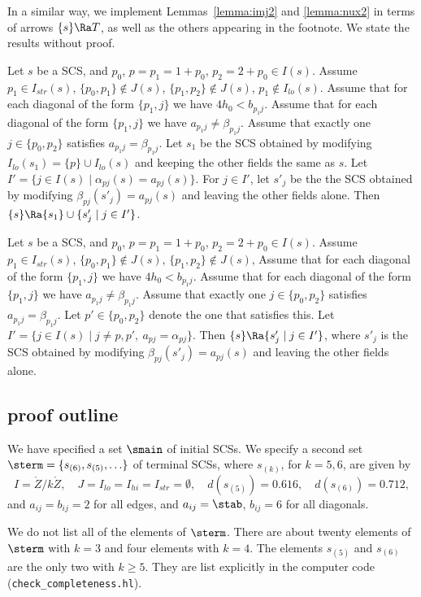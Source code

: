 In a similar way, we implement Lemmas~\ref{lemma:imj2} and \ref{lemma:nux2} 
in terms of arrows $\{s\}\Ra T$, as well as the others appearing in the footnote.
We state the results without proof.

\begin{lemma}
Let $s$ be a SCS, and $p_0$, $p=p_1=1+p_0$, $p_2 = 2+p_0\in I(s)$.
Assume $p_1\in I_{str}(s)$, $\{p_0,p_1\}\not\in J(s)$, $\{p_1,p_2\}\not\in J(s)$,
$p_1\not\in I_{lo}(s)$.
Assume that for each diagonal of the form $\{p_1,j\}$ we have
$4 h_0 <  b_{p_1 j}$.
Assume that for each diagonal of the form $\{p_1,j\}$ we have
$a_{p_1 j} \ne \beta_{p_1 j}$.  Assume that exactly one $j\in\{p_0,p_2\}$ satisfies
$a_{p_1 j} = \beta_{p_1 j}$.  
Let $s_1$ be the SCS obtained by modifying $I_{lo}(s_1) = \{p\}\cup I_{lo}(s)$ and
keeping the other fields the same as $s$.  
Let $I' = \{j \in I(s) \mid \alpha_{p j}(s) = a_{p j}(s)\}$.
For $j\in I'$, let  $s'_j$ be the the SCS obtained
by modifying $\beta_{p j}(s'_j) = a_{p j}(s)$ and leaving the other fields alone.
Then $\{s\} \Ra \{s_1\} \cup \{s'_j \mid j\in I'\}$.
\end{lemma}

\begin{lemma}
Let $s$ be a SCS, and $p_0$, $p=p_1=1+p_0$, $p_2 = 2+p_0\in I(s)$.
Assume $p_1\in I_{str}(s)$, $\{p_0,p_1\}\not\in J(s)$, $\{p_1,p_2\}\not\in J(s)$,
Assume that for each diagonal of the form $\{p_1,j\}$ we have
$4 h_0 <  b_{p_1 j}$.
Assume that for each diagonal of the form $\{p_1,j\}$ we have
$a_{p_1 j} \ne \beta_{p_1 j}$. 
 Assume that exactly one $j\in\{p_0,p_2\}$ satisfies
$a_{p_1 j} = \beta_{p_1 j}$.  Let $p'\in\{p_0,p_2\}$ denote the one that satisfies this.
Let $I' = \{j\in I(s)\mid j\ne p,p',\ a_{p j} = \alpha_{p j}\}$.
Then $\{s\}\Ra \{s'_j \mid j\in I'\}$, where
$s'_j$ is the SCS obtained by modifying $\beta_{p j}(s'_j) = a_{p j}(s)$ and leaving the other fields alone.
\end{lemma}



\subsection{proof outline}

\begin{remark}
We have specified a set $\smain$ of initial SCSs.
We specify a second set $\sterm=\{s_{(6)},s_{(5)},\ldots\}$ 
of terminal SCSs, where
 $s_{(k)}$, for $k=5,6$,  are given by
\[
I=\ring{Z}/k\ring{Z},\quad J=I_{lo}=I_{hi}=I_{str}=\emptyset,\quad d(s_{(5)})=0.616,\quad d(s_{(6)})=0.712,
\]
and $a_{ij}=b_{ij}=2$ for all edges, 
and $a_{ij}=\stab$, $b_{ij}=6$ for all diagonals.

We do not list all of the elements of $\sterm$.  There are about twenty
elements of $\sterm$ with $k=3$ and four elements with $k=4$.  The elements
$s_{(5)}$ and $s_{(6)}$ are the only two with $k\ge 5$.
They are list explicitly
in the computer code (\verb!check_completeness.hl!).
\end{remark}



